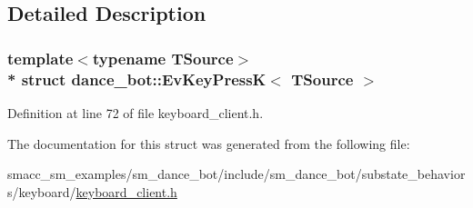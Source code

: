 \subsection{Detailed Description}
\subsubsection*{template$<$typename T\+Source$>$\\*
struct dance\+\_\+bot\+::\+Ev\+Key\+Press\+K$<$ T\+Source $>$}



Definition at line 72 of file keyboard\+\_\+client.\+h.



The documentation for this struct was generated from the following file\+:\begin{DoxyCompactItemize}
\item 
smacc\+\_\+sm\+\_\+examples/sm\+\_\+dance\+\_\+bot/include/sm\+\_\+dance\+\_\+bot/substate\+\_\+behaviors/keyboard/\hyperlink{keyboard__client_8h}{keyboard\+\_\+client.\+h}\end{DoxyCompactItemize}
